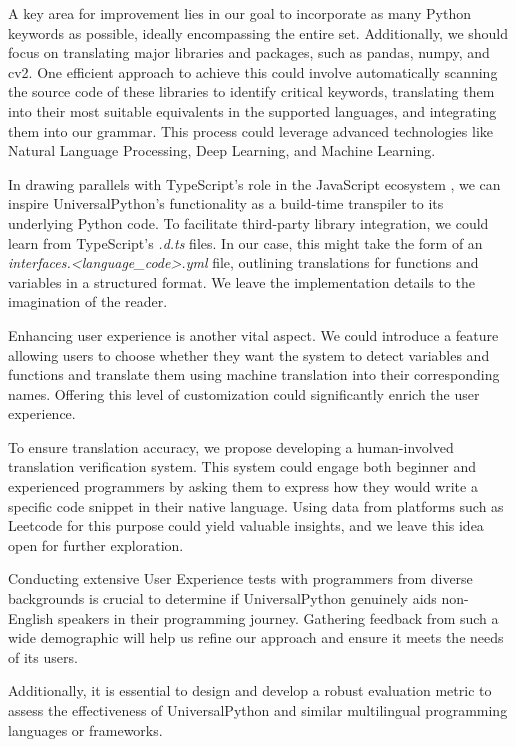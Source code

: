 \documentclass[conference]{IEEEtran}
\begin{document}
A key area for improvement lies in our goal to incorporate as many Python keywords as possible, ideally encompassing the entire set. Additionally, we should focus on translating major libraries and packages, such as pandas, numpy, and cv2. One efficient approach to achieve this could involve automatically scanning the source code of these libraries to identify critical keywords, translating them into their most suitable equivalents in the supported languages, and integrating them into our grammar. This process could leverage advanced technologies like Natural Language Processing, Deep Learning, and Machine Learning.

In drawing parallels with TypeScript's role in the JavaScript ecosystem \cite{Understanding_TypeScript}, we can inspire UniversalPython's functionality as a build-time transpiler to its underlying Python code. To facilitate third-party library integration, we could learn from TypeScript’s {\em *.d.ts} files. In our case, this might take the form of an {\em interfaces.<language\_code>.yml} file, outlining translations for functions and variables in a structured format. We leave the implementation details to the imagination of the reader.

Enhancing user experience is another vital aspect. We could introduce a feature allowing users to choose whether they want the system to detect variables and functions and translate them using machine translation into their corresponding names. Offering this level of customization could significantly enrich the user experience.

To ensure translation accuracy, we propose developing a human-involved translation verification system. This system could engage both beginner and experienced programmers by asking them to express how they would write a specific code snippet in their native language. Using data from platforms such as Leetcode for this purpose could yield valuable insights, and we leave this idea open for further exploration.

Conducting extensive User Experience tests with programmers from diverse backgrounds is crucial to determine if UniversalPython genuinely aids non-English speakers in their programming journey. Gathering feedback from such a wide demographic will help us refine our approach and ensure it meets the needs of its users.

Additionally, it is essential to design and develop a robust evaluation metric to assess the effectiveness of UniversalPython and similar multilingual programming languages or frameworks. 
\end{document}
